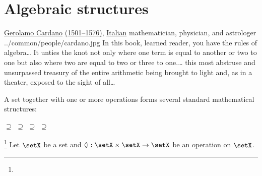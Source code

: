 \chapter{Algebraic structures}
\label{app:algebra}
\qboxnpq
  {\href{http://en.wikipedia.org/wiki/Cardano}{Gerolamo Cardano}
   \href{http://www-history.mcs.st-andrews.ac.uk/Timelines/TimelineC.html}{(1501--1576)},
   \href{http://www-history.mcs.st-andrews.ac.uk/BirthplaceMaps/Places/Italy.html}{Italian} mathematician, physician, and astrologer
   \footnotemark
  }
  {../common/people/cardano.jpg}
  {In this book, learned reader, you have the rules of algebra\ldots
    It unties the knot not only where one term is equal to another or two to one
    but also where two are equal to two or three to one.\ldots
    this most abstruse and unsurpassed treasury of the entire arithmetic being
    brought to light and, as in a theater, exposed to the sight of all\ldots}

A set together with one or more operations forms several standard
mathematical structures:

\indentx {} $\supseteq$  $\supseteq$  $\supseteq$  $\supseteq$ 

\begin{definition}
\footnote{
  }
\label{def:alg_group}
\label{def:group}
Let $\setX$ be a set and $\Diamond:\setX\times \setX\to \setX$ be an operation on $\setX$. \\
\end{definition}

